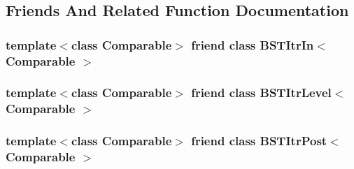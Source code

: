 \subsection{Friends And Related Function Documentation}
\subsubsection[{\texorpdfstring{B\+S\+T\+Itr\+In$<$ Comparable $>$}{BSTItrIn< Comparable >}}]{\setlength{\rightskip}{0pt plus 5cm}template$<$class Comparable$>$ friend class {\bf B\+S\+T\+Itr\+In}$<$ Comparable $>$\hspace{0.3cm}{\ttfamily [friend]}}\hypertarget{classBST_aab3993acac2ab24a0b59edb0c3acc775}{}\label{classBST_aab3993acac2ab24a0b59edb0c3acc775}
\subsubsection[{\texorpdfstring{B\+S\+T\+Itr\+Level$<$ Comparable $>$}{BSTItrLevel< Comparable >}}]{\setlength{\rightskip}{0pt plus 5cm}template$<$class Comparable$>$ friend class {\bf B\+S\+T\+Itr\+Level}$<$ Comparable $>$\hspace{0.3cm}{\ttfamily [friend]}}\hypertarget{classBST_a26ff00bc0d87069aed877f10fd3c80a8}{}\label{classBST_a26ff00bc0d87069aed877f10fd3c80a8}
\subsubsection[{\texorpdfstring{B\+S\+T\+Itr\+Post$<$ Comparable $>$}{BSTItrPost< Comparable >}}]{\setlength{\rightskip}{0pt plus 5cm}template$<$class Comparable$>$ friend class {\bf B\+S\+T\+Itr\+Post}$<$ Comparable $>$\hspace{0.3cm}{\ttfamily [friend]}}\hypertarget{classBST_a5dc153694be266f6e772659486219da7}{}\label{classBST_a5dc153694be266f6e772659486219da7}
